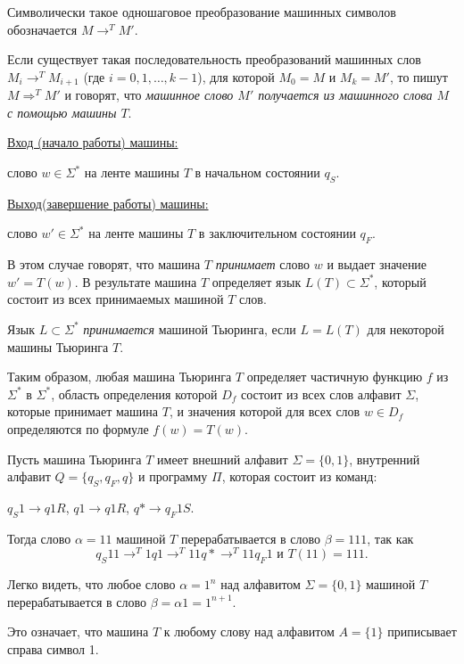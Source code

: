 Символически такое одношаговое преобразование машинных символов обозначается $M\rightarrow^T M'$.

Если существует такая последовательность преобразований машинных слов  $M_i\rightarrow^T M_{i+1}$ (где $i=0,1,\ldots,k-1$), для которой $M_0=M$ и $M_k=M'$, то пишут $M\Rightarrow^T M'$ и говорят, что \textit{машинное слово $M'$ получается из машинного слова $M$ с помощью машины $T$}.

\underline{Вход (начало работы) машины:}

слово $w\in\Sigma^*$ на ленте машины $T$ в начальном состоянии $q_S$.

\underline{Выход(завершение работы) машины:}

слово $w'\in\Sigma^*$ на ленте машины $T$ в заключительном состоянии $q_F$.

В этом случае говорят, что машина $T$ \textit{принимает} слово $w$ и выдает значение $w'=T(w)$. В результате машина $T$ определяет язык $L(T)\subset\Sigma^*$, который состоит из всех принимаемых машиной $T$ слов.

\begin{definition}
    Язык $L\subset\Sigma^*$ \textit{принимается} машиной Тьюринга, если $L=L(T)$ для некоторой машины Тьюринга $T$.
\end{definition}

Таким образом, любая машина Тьюринга $T$ определяет частичную функцию $f$ из $\Sigma^*$ в $\Sigma^*$, область определения которой $D_f$ состоит из всех слов алфавит $\Sigma$, которые принимает машина $T$, и значения которой для всех слов $w\in D_f$ определяются по формуле $f(w)=T(w)$.

\begin{example}
    Пусть машина Тьюринга $T$ имеет внешний алфавит $\Sigma=\{0,1\}$, внутренний алфавит $Q=\{q_S,q_F,q\}$ и программу $\Pi$, которая состоит из команд: 

    $q_S1\rightarrow q1R$, $q1\rightarrow q1R$, $q*\rightarrow q_F 1S$.

    Тогда слово $\alpha=11$ машиной $T$ перерабатывается в слово $\beta =111$, так как
    $$q_S11\rightarrow^T 1q1\rightarrow^T 11q*\rightarrow^T 11q_F1 \text{ и } T(11)=111.$$

    Легко видеть, что любое слово $\alpha=1^n$ над алфавитом $\Sigma = \{0,1\}$ машиной $T$ перерабатывается в слово $\beta=\alpha 1=1^{n+1}$.

    Это означает, что машина $T$ к любому слову над алфавитом $A=\{1\}$ приписывает справа символ 1.
\end{example}
